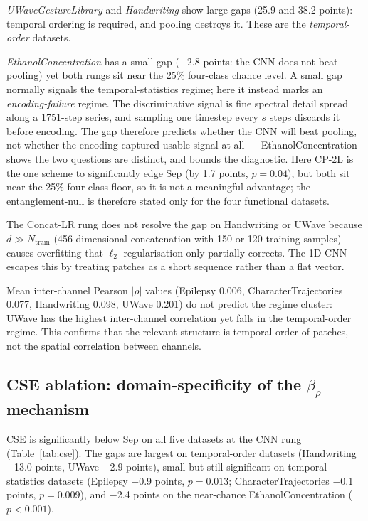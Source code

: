 \documentclass[conference,compsoc]{IEEEtran}
\begin{document}
\textit{UWaveGestureLibrary} and \textit{Handwriting} show large gaps
(25.9 and 38.2 points): temporal ordering is required, and pooling
destroys it.
These are the \textit{temporal-order} datasets.

\textit{EthanolConcentration} has a small gap ($-2.8$ points: the CNN
does not beat pooling) yet both rungs sit near the 25\% four-class
chance level. A small gap normally signals the temporal-statistics
regime; here it instead marks an \textit{encoding-failure} regime. The
discriminative signal is fine spectral detail spread along a 1751-step
series, and sampling one timestep every $s$ steps discards it before
encoding. The gap therefore predicts whether the CNN will beat
pooling, not whether the encoding captured usable signal at all ---
EthanolConcentration shows the two questions are distinct, and bounds
the diagnostic.
Here CP-2L is the one scheme to significantly edge Sep (by 1.7 points,
$p = 0.04$), but both sit near the 25\% four-class floor, so it is not
a meaningful advantage; the entanglement-null is therefore stated only
for the four functional datasets.

The Concat-LR rung does not resolve the gap on Handwriting or UWave
because $d \gg N_\text{train}$ (456-dimensional concatenation with
150 or 120 training samples) causes overfitting that $\ell_2$
regularisation only partially corrects.
The 1D CNN escapes this by treating patches as a short sequence
rather than a flat vector.

Mean inter-channel Pearson $\lvert\rho\rvert$ values
(Epilepsy 0.006, CharacterTrajectories 0.077, Handwriting 0.098,
UWave 0.201) do not predict the regime cluster:
UWave has the highest inter-channel correlation yet falls in the
temporal-order regime.
This confirms that the relevant structure is temporal order of patches,
not the spatial correlation between channels.

\subsection{CSE ablation: domain-specificity of the $\beta_\rho$ mechanism}
\label{sec:cse}

CSE is significantly below Sep on all five datasets at the CNN rung
(Table~\ref{tab:cse}).
The gaps are largest on temporal-order datasets (Handwriting $-$13.0
points, UWave $-$2.9 points), small but still significant on
temporal-statistics datasets (Epilepsy $-$0.9 points, $p = 0.013$;
CharacterTrajectories $-$0.1 points, $p = 0.009$), and $-$2.4 points
on the near-chance EthanolConcentration ($p < 0.001$).
\end{document}
